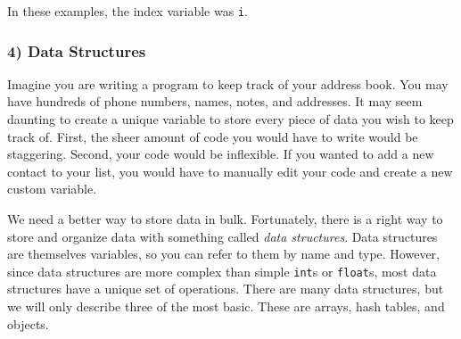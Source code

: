 \documentclass[a4paper]{article}
\begin{document}
In these examples, the index variable was \texttt{i}.

\subsubsection{4) Data Structures}

Imagine you are writing a program to keep track of your address book. You may have hundreds of phone numbers, names, notes, and addresses. It may seem daunting to create a unique variable to store every piece of data you wish to keep track of. First, the sheer amount of code you would have to write would be staggering. Second, your code would be inflexible. If you wanted to add a new contact to your list, you would have to manually edit your code and create a new custom variable.

We need a better way to store data in bulk. Fortunately, there is a right way to store and organize data with something called {\it data structures}. Data structures are themselves variables, so you can refer to them by name and type. However, since data structures are more complex than simple \texttt{int}s or \texttt{float}s, most data structures have a unique set of operations. There are many data structures, but we will only describe three of the most basic. These are arrays, hash tables, and objects.
\end{document}
